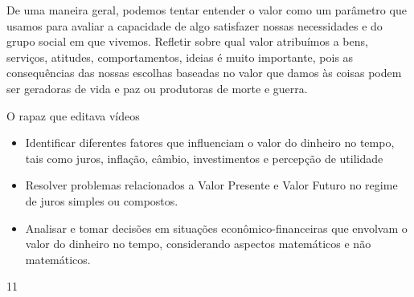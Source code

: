 \begin{reflection}
De uma maneira geral, podemos tentar entender o valor como um parâmetro que usamos para avaliar a capacidade de algo satisfazer nossas necessidades e do grupo social em que vivemos. Refletir sobre qual valor atribuímos a bens, serviços, atitudes, comportamentos, ideias é muito importante, pois as consequências das nossas escolhas baseadas no valor que damos às coisas podem ser geradoras de vida e paz ou produtoras de morte e guerra.
\end{reflection}

\clearpage

\def\currentcolor{session2}

\begin{objectives}{O rapaz que editava vídeos}
{
\begin{itemize}
\item Identificar diferentes fatores que influenciam o valor do dinheiro no tempo, tais como juros, inflação, câmbio, investimentos e percepção de utilidade
\item Resolver problemas relacionados a Valor Presente e Valor Futuro no regime de juros simples ou compostos.
\item Analisar e tomar decisões em situações econômico-financeiras que envolvam o valor do dinheiro no tempo, considerando aspectos matemáticos e não matemáticos.
\end{itemize}
}{1}{1}
\end{objectives}

